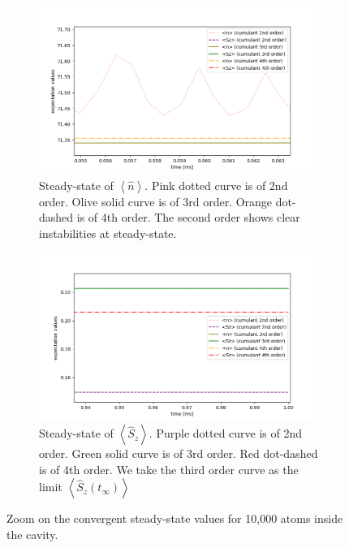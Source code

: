 \documentclass[11pt]{report}
\begin{document}
\begin{figure}[h!]
\centering
\begin{subfigure}{.48\textwidth}
  \centering
  \includegraphics[width=1.1\linewidth]{10k_234_nsz_zoom_2}
  \caption{Steady-state of $\left\langle \hat{n} \right\rangle$. Pink dotted curve is of 2nd order. Olive solid curve is of 3rd order. Orange dot-dashed is of 4th order. The second order shows clear instabilities at steady-state.}
  \label{fig:steady-2nd-unstable}
\end{subfigure}%
\hspace{1em}%
\begin{subfigure}{.48\textwidth}
  \centering
  \includegraphics[width=1\linewidth]{10k_234_nsz_zoom_3}
  \caption{Steady-state of $\left\langle \hat{S}_z \right\rangle$. Purple dotted curve is of 2nd order. Green solid curve is of 3rd order. Red dot-dashed is of 4th order. We take the third order curve as the limit $\left\langle \hat{S}_z(t_\infty) \right\rangle$}
\end{subfigure}
\caption{Zoom on the convergent steady-state values for 10,000 atoms inside the cavity.}
\end{figure}
\end{document}
